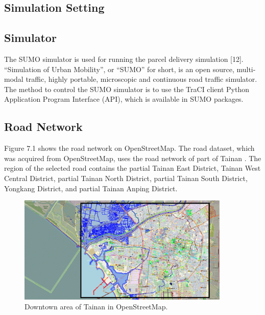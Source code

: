 \documentclass[12pt]{ksthesis}
\begin{document}
\begin{thesis}
{\section{Simulation Setting}

\subsection{Simulator}
The SUMO simulator is used for running the parcel delivery simulation [12]. “Simulation of Urban Mobility”, or “SUMO” for short, is an open source, multi-modal traffic, highly portable, microscopic and continuous road traffic simulator. The method to control the SUMO simulator is to use the TraCI client Python Application Program Interface (API), which is available in SUMO packages.

\subsection{Road Network}

Figure 7.1 shows the road network on OpenStreetMap.
The road dataset, which was acquired from OpenStreetMap, uses the road network of part of Tainan \cite{Haklay2008}. The region of the selected road contains the partial Tainan East District, Tainan West Central District, partial Tainan North District, partial Tainan South District, Yongkang District, and partial Tainan Anping District.



\begin{figure}[H]
\centering
\includegraphics[width=0.9\textwidth]{./Thesis_figures/F7-1_Openstreetmap.PNG}
\caption{\large Downtown area of Tainan in OpenStreetMap.}
\vspace{0.5cm}
\label{Fig:DowntownArea_in_OpenStreetMap.}
\end{figure}

}
\end{thesis}
\end{document}
